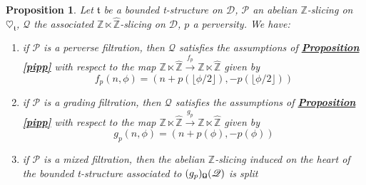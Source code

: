 \documentclass{article}
\newtheorem{prop}[thm]{Proposition}
\theoremstyle{definition}
\begin{document}
%

\begin{prop}\label{grad}
Let $\mathfrak{t}$ be a bounded t-structure on $\mathscr{D}$, $\mathscr{P}$ an abelian $\mathbb{Z}$-slicing on $\heartsuit_{\mathfrak{t}}$, $\mathscr{Q}$ the associated $\mathbb{Z} \ltimes \hat{\mathbb{Z}}$-slicing on $\mathscr{D}$, $p$ a perversity. We have: 
\begin{enumerate}
\item if $\mathscr{P}$ is a perverse filtration, then $\mathscr{Q}$ satisfies the assumptions of \hyperref[pipp]{\textbf{Proposition \ref*{pipp}}} with respect to the map $\mathbb{Z} \ltimes \hat{\mathbb{Z}} \overset{f_p}{\longrightarrow} \mathbb{Z} \ltimes \hat{\mathbb{Z}}$ given by $$f_p(n,\phi)=(n+p(\lfloor \phi / 2 \rfloor),-p(\lfloor \phi / 2 \rfloor))$$ 
\item if $\mathscr{P}$ is a grading filtration, then $\mathscr{Q}$ satisfies the assumptions of \hyperref[pipp]{\textbf{Proposition \ref*{pipp}}} with respect to the map $\mathbb{Z} \ltimes \hat{\mathbb{Z}} \overset{g_p}{\longrightarrow} \mathbb{Z} \ltimes \hat{\mathbb{Z}}$ given by $$g_p(n,\phi)=(n+p(\phi),-p(\phi))$$ 
\item if $\mathscr{P}$ is a mixed filtration, then the abelian $\mathbb{Z}$-slicing induced on the heart of the bounded t-structure associated to $(g_p)_{\textnormal{\Libra}}(\mathscr{Q})$ is split 
\end{enumerate}
\end{prop}
\end{document}
